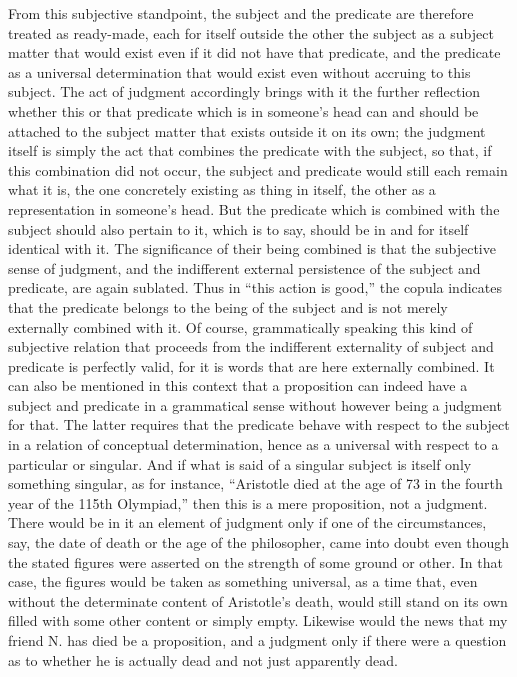 From this subjective standpoint,
the subject and the predicate are
therefore treated as ready-made,
each for itself outside the other
the subject as a subject matter
that would exist even if it did not have that predicate,
and the predicate as a universal determination
that would exist even without accruing to this subject.
The act of judgment accordingly brings with it
the further reflection whether this or that predicate
which is in someone's head can
and should be attached to the subject matter
that exists outside it on its own;
the judgment itself is simply the act
that combines the predicate with the subject,
so that, if this combination did not occur,
the subject and predicate would still each remain what it is,
the one concretely existing as thing in itself,
the other as a representation in someone's head.
But the predicate which is combined with the subject
should also pertain to it,
which is to say, should be in and for itself identical with it.
The significance of their being combined is
that the subjective sense of judgment,
and the indifferent external persistence of the subject and predicate,
are again sublated.
Thus in “this action is good,” the copula indicates
that the predicate belongs to the being of the subject
and is not merely externally combined with it.
Of course, grammatically speaking this kind of subjective relation
that proceeds from the indifferent externality of subject and predicate is
perfectly valid, for it is words that are here externally combined.
It can also be mentioned in this context that
a proposition can indeed have a subject and predicate
in a grammatical sense without however being a judgment for that.
The latter requires that the predicate behave
with respect to the subject in a relation of conceptual determination,
hence as a universal with respect to a particular or singular.
And if what is said of a singular subject is
itself only something singular, as for instance,
“Aristotle died at the age of 73
in the fourth year of the 115th Olympiad,”
then this is a mere proposition, not a judgment.
There would be in it an element of judgment
only if one of the circumstances, say,
the date of death or the age of the philosopher,
came into doubt even though the stated figures
were asserted on the strength of some ground or other.
In that case, the figures would be taken as something universal,
as a time that, even without the determinate content of Aristotle's death,
would still stand on its own filled with some other content or simply empty.
Likewise would the news that my friend N. has died be a proposition,
and a judgment only if there were a question as to whether
he is actually dead and not just apparently dead.

